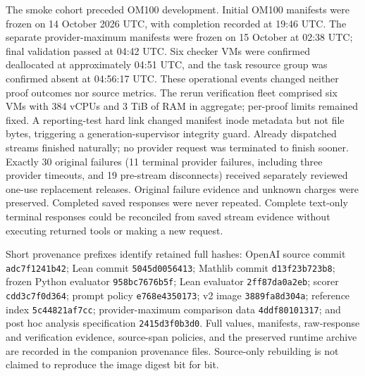 \documentclass[11pt]{article}
\begin{document}
The smoke cohort preceded OM100 development. Initial OM100 manifests were frozen on 14 October 2026 UTC, with completion recorded at 19:46 UTC. The separate provider-maximum manifests were frozen on 15 October at 02:38 UTC; final validation passed at 04:42 UTC. Six checker VMs were confirmed deallocated at approximately 04:51 UTC, and the task resource group was confirmed absent at 04:56:17 UTC. These operational events changed neither proof outcomes nor source metrics. The rerun verification fleet comprised six VMs with 384 vCPUs and 3 TiB of RAM in aggregate; per-proof limits remained fixed. A reporting-test hard link changed manifest inode metadata but not file bytes, triggering a generation-supervisor integrity guard. Already dispatched streams finished naturally; no provider request was terminated to finish sooner. Exactly 30 original failures (11 terminal provider failures, including three provider timeouts, and 19 pre-stream disconnects) received separately reviewed one-use replacement releases. Original failure evidence and unknown charges were preserved. Completed saved responses were never repeated. Complete text-only terminal responses could be reconciled from saved stream evidence without executing returned tools or making a new request.

Short provenance prefixes identify retained full hashes: OpenAI source commit \texttt{adc7f1241b42}; Lean commit \texttt{5045d0056413}; Mathlib commit \texttt{d13f23b723b8}; frozen Python evaluator \texttt{958bc7676b5f}; Lean evaluator \texttt{2ff87da0a2eb}; scorer \texttt{cdd3c7f0d364}; prompt policy \texttt{e768e4350173}; v2 image \texttt{3889fa8d304a}; reference index \texttt{5c44821af7cc}; provider-maximum comparison data \texttt{4ddf80101317}; and post hoc analysis specification \texttt{2415d3f0b3d0}. Full values, manifests, raw-response and verification evidence, source-span policies, and the preserved runtime archive are recorded in the companion provenance files. Source-only rebuilding is not claimed to reproduce the image digest bit for bit.
\end{document}
